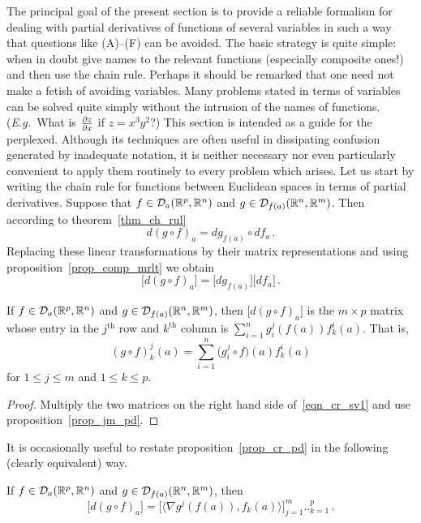The principal goal of the present section is to provide a reliable formalism for dealing with
partial derivatives of functions of several variables in such a way that questions like
(A)--(F) can be avoided.  The basic strategy is quite simple: when in doubt give names to the
relevant functions (especially composite ones!) and then use the chain rule.  Perhaps it
should be remarked that one need not make a fetish of avoiding variables. Many problems stated
in terms of variables can be solved quite simply without the intrusion of the names of
functions. (\emph{E.g.\ }What is $\frac{\partial z}{\partial x}$ if $z = x^3y^2$?)  This section is intended as a
guide for the perplexed.  Although its techniques are often useful in dissipating confusion
generated by inadequate notation, it is neither necessary nor even particularly convenient to
apply them routinely to every problem which arises. Let us start by writing the chain rule for
functions between Euclidean spaces in terms of partial derivatives.  Suppose that $f \in \mathcal{D}_a(\mathbb{R}^p,\mathbb{R}^n)$ and $g \in \mathcal{D}_{f(a)}(\mathbb{R}^n,\mathbb{R}^m)$. Then according to
theorem~\ref{thm_ch_rul}
  \[ d(g \circ f)_a = dg_{f(a)} \circ df_a\,. \]
Replacing these linear transformations by their matrix representations and using
proposition~\ref{prop_comp_mrlt} we obtain
 \begin{equation}\label{eqn_cr_sv1}
    \bigl[d(g \circ f)_a\bigr] = \bigl[dg_{f(a)}\bigr]\bigl[df_a\bigr]\,.
 \end{equation}

\begin{prop}\label{prop_cr_pd}  If $f \in \mathcal{D}_a(\mathbb{R}^p,\mathbb{R}^n)$ and $g \in \mathcal{D}_{f(a)}(\mathbb{R}^n,\mathbb{R}^m)$, then $\bigl[d(g \circ f)_a\bigr]$ is the $m \times p$ matrix whose entry
in the $j^{\text{th}}$ row and $k^{\text{th}}$ column is $\sum_{i=1}^n g_i^j(f(a))f_k^i(a)$.
That is,
  \[ (g \circ f)_k^j(a) = \sum_{i=1}^n\bigl(g_i^j \circ f\bigr)(a) f_k^i(a) \]
for $1 \le j \le m$ and $1 \le k \le p$.
\end{prop}

\begin{proof} Multiply the two matrices on the right hand side of~\eqref{eqn_cr_sv1} and use
proposition~\ref{prop_jm_pd}.
\end{proof}


It is occasionally useful to restate proposition~\ref{prop_cr_pd} in the following (clearly
equivalent) way.

\begin{cor} If $f \in \mathcal{D}_a(\mathbb{R}^p,\mathbb{R}^n)$ and $g \in \mathcal{D}_{f(a)}(\mathbb{R}^n,\mathbb{R}^m)$, then
  \[ \bigl[d(g \circ f)_a\bigr] = \bigl[\langle\nabla g^j(f(a)) ,
                         f_k(a)\rangle\bigr]_{j=1}^m{\bigl.\bigr.}_{k=1}^p\,. \]
\end{cor}

